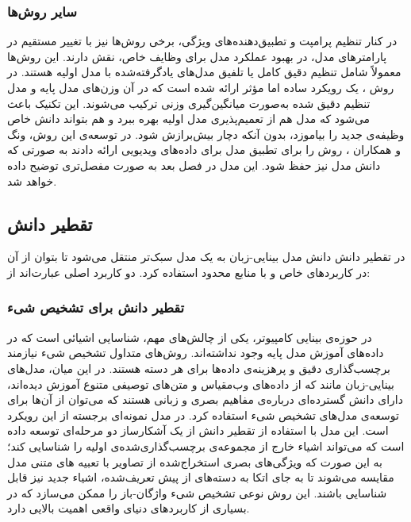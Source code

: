 \subsubsection{سایر روش‌ها}
در کنار تنظیم پرامپت و تطبیق‌دهنده‌های ویژگی، برخی روش‌ها نیز با تغییر مستقیم در پارامتر‌های مدل، در بهبود عملکرد مدل برای وظایف خاص، نقش دارند. این روش‌ها معمولاً شامل تنظیم دقیق کامل یا تلفیق مدل‌های یادگرفته‌شده با مدل اولیه هستند. در روش
\cite{Wise-FT}
، یک رویکرد ساده اما مؤثر ارائه شده است که در آن وزن‌های مدل پایه و مدل تنظیم دقیق شده  به‌صورت میانگین‌گیری وزنی ترکیب می‌شوند. این تکنیک باعث می‌شود که مدل هم از تعمیم‌پذیری مدل اولیه بهره ببرد و هم بتواند دانش خاص وظیفه‌ی جدید را بیاموزد، بدون آنکه دچار بیش‌برازش شود. در توسعه‌ی این روش، ونگ و همکاران
\cite{open-vclip}،
روش 
را برای تطبیق مدل  برای داده‌های ویدیویی ارائه دادند به صورتی که دانش مدل  نیز حفظ شود. این مدل در فصل بعد به صورت مفصل‌تری توضیح داده خواهد شد. 
\subsection{تقطیر دانش}
در تقطیر دانش
دانش مدل بینایی-زبان به یک مدل سبک‌تر منتقل می‌شود تا بتوان از آن در کاربردهای خاص و با منابع محدود استفاده کرد. دو کاربرد اصلی عبارت‌اند از:
\subsubsection{تقطیر دانش برای تشخیص شیء}
در حوزه‌ی بینایی کامپیوتر، یکی از چالش‌های مهم، شناسایی اشیائی است که در داده‌های آموزش مدل پایه وجود نداشته‌اند. روش‌های متداول تشخیص شیء نیازمند برچسب‌گذاری دقیق و پرهزینه‌ی داده‌ها برای هر دسته هستند. در این میان، مدل‌های بینایی-زبان مانند
 که از داده‌های وب‌مقیاس و متن‌های توصیفی متنوع آموزش دیده‌اند، دارای دانش گسترده‌ای درباره‌ی مفاهیم بصری و زبانی هستند که می‌توان از آن‌ها برای توسعه‌ی مدل‌های تشخیص شیء استفاده کرد. در مدل 
 \cite{ViLD}
نمونه‌ای برجسته از این رویکرد است. این مدل با استفاده از تقطیر دانش از 
یک آشکارساز دو مرحله‌ای توسعه داده است که می‌تواند اشیاء خارج از مجموعه‌ی برچسب‌گذاری‌شده‌ی اولیه را شناسایی کند؛ به این صورت که ویژگی‌های بصری استخراج‌شده از تصاویر با تعبیه های متنی مدل
مقایسه می‌شوند تا به جای اتکا به دسته‌های از پیش تعریف‌شده، اشیاء جدید نیز قابل شناسایی باشند. این روش نوعی تشخیص شیء واژگان-باز  را ممکن می‌سازد که در بسیاری از کاربردهای دنیای واقعی اهمیت بالایی دارد.
